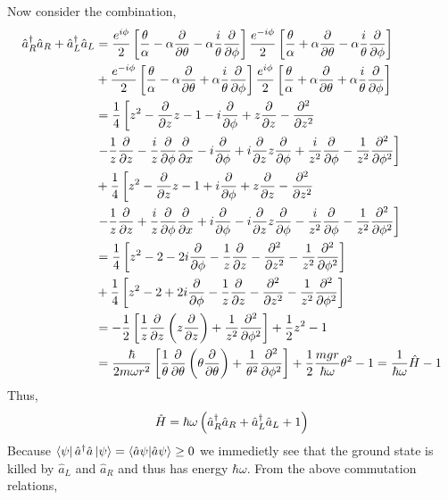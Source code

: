 \documentclass[12pt]{extarticle}
\begin{document}
Now consider the combination,
\begin{align*}
\hat{a}_R^\dagger \hat{a}_R + \hat{a}_L^\dagger \hat{a}_L &= \frac{e^{i \phi}}{2} \left[\frac{\theta}{\alpha}  - \alpha \frac{\partial{}}{\partial{\theta}} - \alpha \frac{i}{\theta} \frac{\partial{}}{\partial{\phi}}  \right] \frac{e^{-i \phi}}{2} \left[\frac{\theta}{\alpha}  + \alpha \frac{\partial{}}{\partial{\theta}} - \alpha \frac{i}{\theta} \frac{\partial{}}{\partial{\phi}}  \right]  \\ & + \frac{e^{-i \phi}}{2} \left[\frac{\theta}{\alpha}  - \alpha \frac{\partial{}}{\partial{\theta}}  + \alpha \frac{i}{\theta} \frac{\partial{}}{\partial{\phi}}  \right] \frac{e^{i \phi}}{2} \left[\frac{\theta}{\alpha}  + \alpha \frac{\partial{}}{\partial{\theta}} + \alpha \frac{i}{\theta} \frac{\partial{}}{\partial{\phi}}  \right] \\ 
&= \frac{1}{4} \left[z^2 - \frac{\partial{}}{\partial{z}} z - 1 - i \frac{\partial{}}{\partial{\phi}} + z \frac{\partial{}}{\partial{z}} - \frac{\partial^2{}}{\partial{z}^2} \right. \\ & \left. - \frac{1}{z} \frac{\partial{}}{\partial{z}}  - \frac{i}{z} \frac{\partial{}}{\partial{\phi}} \frac{\partial{}}{\partial{x}}  - i \frac{\partial{}}{\partial{\phi}} + i \frac{\partial{}}{\partial{z}} z \frac{\partial{}}{\partial{\phi}} + \frac{i}{z^2} \frac{\partial{}}{\partial{\phi}} - \frac{1}{z^2} \frac{\partial^2{}}{\partial{\phi}^2} \right] \\ & + 
\frac{1}{4} \left[z^2 - \frac{\partial{}}{\partial{z}} z - 1 + i \frac{\partial{}}{\partial{\phi}} + z \frac{\partial{}}{\partial{z}} - \frac{\partial^2{}}{\partial{z}^2} \right. \\ & \left. - \frac{1}{z} \frac{\partial{}}{\partial{z}}  + \frac{i}{z} \frac{\partial{}}{\partial{\phi}} \frac{\partial{}}{\partial{x}}  + i \frac{\partial{}}{\partial{\phi}} - i \frac{\partial{}}{\partial{z}} z \frac{\partial{}}{\partial{\phi}} - \frac{i}{z^2} \frac{\partial{}}{\partial{\phi}} - \frac{1}{z^2} \frac{\partial^2{}}{\partial{\phi}^2} \right] \\ & = \frac{1}{4} \left[z^2 - 2 - 2i \frac{\partial{}}{\partial{\phi}} - \frac{1}{z} \frac{\partial{}}{\partial{z}} - \frac{\partial^2{}}{\partial{z}^2} - \frac{1}{z^2} \frac{\partial^2{}}{\partial{\phi}^2} \right] \\ & + 
\frac{1}{4} \left[z^2 - 2 + 2i \frac{\partial{}}{\partial{\phi}} - \frac{1}{z} \frac{\partial{}}{\partial{z}} - \frac{\partial^2{}}{\partial{z}^2} - \frac{1}{z^2} \frac{\partial^2{}}{\partial{\phi}^2} \right] \\ & = - \frac{1}{2} \left[\frac{1}{z} \frac{\partial{}}{\partial{z}} \left( z \frac{\partial{}}{\partial{z}} \right) + \frac{1}{z^2} \frac{\partial^2{}}{\partial{\phi}^2} \right] + \frac{1}{2} z^2 - 1 \\ & = \frac{\hbar}{2m \omega r^2} \left[\frac{1}{\theta} \frac{\partial{}}{\partial{\theta}} \left( \theta \frac{\partial{}}{\partial{\theta}} \right) + \frac{1}{\theta^2} \frac{\partial^2{}}{\partial{\phi}^2} \right] + \frac{1}{2} \frac{m g r}{\hbar \omega} \theta^2 - 1 = \frac{1}{\hbar \omega} \hat{H} - 1 
\end{align*}
Thus,
\[\hat{H} = \hbar \omega \left( \hat{a}_R^\dagger \hat{a}_R + \hat{a}_L^\dagger \hat{a}_L + 1 \right)\]
Because $\left< \psi \right| \hat{a}^\dagger \hat{a} \left| \psi \right> = \left< \hat{a} \psi | \hat{a} \psi \right> \ge 0$ we immedietly see that the ground state is killed by $\hat{a}_L$ and $\hat{a}_R$ and thus has energy $\hbar \omega$. From the above commutation relations, 
\end{document}
